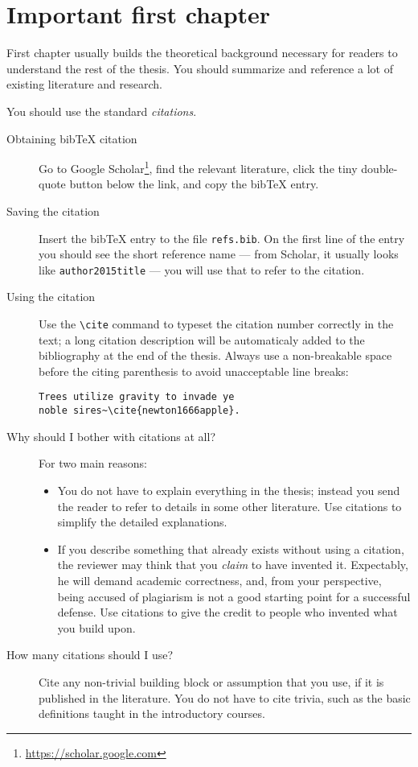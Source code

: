 \chapter{Important first chapter}
\label{chap:refs}

First chapter usually builds the theoretical background necessary for readers to understand the rest of the thesis. You should summarize and reference a lot of existing literature and research.

You should use the standard \emph{citations}.

\begin{description}
\item[Obtaining bibTeX citation] Go to Google Scholar\footnote{\url{https://scholar.google.com}}, find the relevant literature, click the tiny double-quote button below the link, and copy the bibTeX entry.
\item[Saving the citation] Insert the bibTeX entry to the file \texttt{refs.bib}. On the first line of the entry you should see the short reference name --- from Scholar, it usually looks like \texttt{author2015title} --- you will use that to refer to the citation.
\item[Using the citation] Use the \verb|\cite| command to typeset the citation number correctly in the text; a long citation description will be automaticaly added to the bibliography at the end of the thesis. Always use a non-breakable space before the citing parenthesis to avoid unacceptable line breaks:
\begin{Verbatim}
Trees utilize gravity to invade ye
noble sires~\cite{newton1666apple}.
\end{Verbatim}
\item[Why should I bother with citations at all?] For two main reasons:
\begin{itemize}
\item You do not have to explain everything in the thesis; instead you send the reader to refer to details in some other literature. Use citations to simplify the detailed explanations.
\item If you describe something that already exists without using a citation, the reviewer may think that you \emph{claim} to have invented it. Expectably, he will demand academic correctness, and, from your perspective, being accused of plagiarism is not a good starting point for a successful defense. Use citations to give the credit to people who invented what you build upon.
\end{itemize}
\item[How many citations should I use?]
Cite any non-trivial building block or assumption that you use, if it is published in the literature. You do not have to cite trivia, such as the basic definitions taught in the introductory courses.


\end{description}
